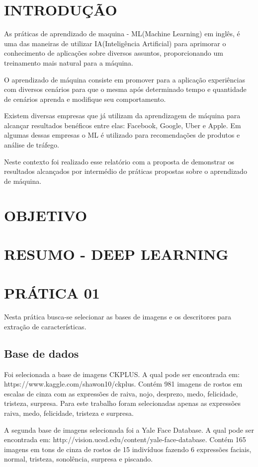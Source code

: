 \documentclass[a4paper, 12 pt, conference]{ieeeconf}  %
\begin{document}
\section{INTRODUÇÃO}
As práticas de aprendizado de maquina - ML(Machine Learning) em inglês, é uma das maneiras de utilizar IA(Inteligência Artificial) para aprimorar o conhecimento de aplicações sobre diversos assuntos, proporcionando um treinamento mais natural para a máquina.

O aprendizado de máquina consiste em promover para a aplicação experiências com diversos cenários para que o mesma após determinado tempo e quantidade de cenários aprenda e modifique seu comportamento.

Existem diversas empresas que já utilizam da aprendizagem de máquina para alcançar resultados benéficos entre elas: Facebook, Google, Uber e Apple. Em algumas dessas empresas o ML é utilizado para recomendações de produtos e análise de tráfego.

Neste contexto foi realizado esse relatório com a proposta de demonstrar os resultados alcançados por intermédio de práticas propostas sobre o aprendizado de máquina.
\section{OBJETIVO}
\section{RESUMO - DEEP LEARNING}
\section{PRÁTICA 01}
\label{pratica01}
Nesta prática busca-se selecionar as bases de imagens e os descritores para extração de características.

\subsection{Base de dados}
Foi selecionada a base de imagens CKPLUS. A qual pode ser encontrada em: https://www.kaggle.com/shawon10/ckplus. Contém 981 imagens de rostos em escalas de cinza com as expressões de raiva, nojo, desprezo, medo, felicidade, tristeza, surpresa. Para este trabalho foram selecionadas apenas as expressões raiva, medo, felicidade, tristeza e surpresa.

A segunda base de imagens selecionada foi a Yale Face Database. A qual pode ser encontrada em: http://vision.ucsd.edu/content/yale-face-database. Contém 165 imagens em tons de cinza de rostos de 15 indivíduos fazendo 6 expressões faciais, normal, tristeza, sonolência, surpresa e piscando.
\end{document}
